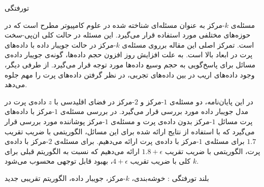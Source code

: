 


\pagestyle{empty}

‌تورفتگی

مسئله‌ی $k$-مرکز به عنوان مسئله‌ای شناخته شده در علوم کامپیوتر مطرح است که در حوزه‌های مختلفی مورد استفاده قرار می‌گیرد.  این مسئله در حالت کلی ان‌پی-سخت است. تمرکز اصلی این مقاله برروی مسئله‌ی $k$-مرکز در حالت جویبار داده با داده‌های پرت در ابعاد بالا است. به علت افزایش روز افزون حجم داده‌ها، گونه‌ی جویبار داده‌ی مسائل برای پاسخ‌گویی به حجم وسیع داده‌ها مورد توجه قرار می‌گیرد. از طرفی دیگر، وجود داده‌های اریب در بین داده‌های تجربی، در نظر گرفتن داده‌های پرت را مهم جلوه می‌دهد.

در این پایان‌نامه، دو مسئله‌ی $1$-مرکز و $2$-مرکز در فضای اقلیدسی با $z$ داده‌ی پرت در مدل جویبار داده مورد بررسی قرار می‌گیرد. در بررسی مسئله‌ی $1$-مرکز با داده‌های پرت مسائل $1$-مرکز بدون داده‌ی پرت و مسئله‌ی $1$-مرکز پوشاننده مورد بررسی قرار می‌گیرد که با استفاده از نتایج ارائه شده برای این مسائل، الگوریتمی با ضریب تقریب $1.7$ برای مسئله‌ی $1$-مرکز با داده‌ی پرت ارائه می‌دهیم. برای مسئله‌ی $2$-مرکز با داده‌ی پرت، الگوریتمی با ضریب تقریب $1.8 + \epsilon$ ارائه می‌دهیم که نسبت به الگوریتم قبلی برای $k$ کلی با ضریب تقریب $4 + \epsilon$، بهبود قابل توجهی محسوب می‌شود.

‌بلند
‌تورفتگی : 
خوشه‌بندی، $k$-مرکز، جویبار داده، الگوریتم تقریبی
‌جدید
